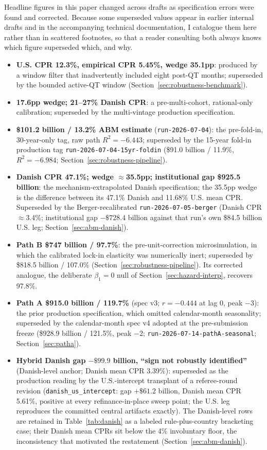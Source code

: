 \documentclass[12pt]{article}
\begin{document}
Headline figures in this paper changed across drafts as specification errors were found and corrected. Because some superseded values appear in earlier internal drafts and in the accompanying technical documentation, I catalogue them here rather than in scattered footnotes, so that a reader consulting both always knows which figure superseded which, and why.

\begingroup\sloppy
\begin{itemize}
\item \textbf{U.S. CPR 12.3\%, empirical CPR 5.45\%, wedge 35.1pp}: produced by a window filter that inadvertently included eight post-QT months; superseded by the bounded active-QT window (Section~\ref{sec:robustness-benchmark}).
\item \textbf{17.6pp wedge; 21--27\% Danish CPR}: a pre-multi-cohort, rational-only calibration; superseded by the multi-vintage production specification.
\item \textbf{\$101.2 billion / 13.2\% ABM estimate} (\texttt{run-2026-07-04}): the pre-fold-in, 30-year-only tag, raw path $R^2 = -6.443$; superseded by the 15-year fold-in production tag \texttt{run-2026-07-04-15yr-foldin} (\$91.0 billion / 11.9\%, $R^2 = -6.984$; Section~\ref{sec:robustness-pipeline}).
\item \textbf{Danish CPR 47.1\%; wedge $\approx$35.5pp; institutional gap \$925.5 billion}: the mechanism-extrapolated Danish specification; the 35.5pp wedge is the difference between its 47.1\% Danish and 11.68\% U.S. mean CPR. Superseded by the Berger-recalibrated \texttt{run-2026-07-05-berger} (Danish CPR $\approx$3.4\%; institutional gap $-\$728.4$ billion against that run's own \$84.5 billion U.S. leg; Section~\ref{sec:abm-danish}).
\item \textbf{Path B \$747 billion / 97.7\%}: the pre-unit-correction microsimulation, in which the calibrated lock-in elasticity was numerically inert; superseded by \$818.5 billion / 107.0\% (Section~\ref{sec:robustness-pipeline}). Its corrected analogue, the deliberate $\beta_1 = 0$ null of Section~\ref{sec:hazard-interp}, recovers 97.8\%.
\item \textbf{Path A \$915.0 billion / 119.7\%} (spec v3; $r = -0.444$ at lag 0, peak $-3$): the prior production specification, which omitted calendar-month seasonality; superseded by the calendar-month spec v4 adopted at the pre-submission freeze (\$928.9 billion / 121.5\%, peak $-2$; \texttt{run-2026-07-14-pathA-seasonal}; Section~\ref{sec:patha}).
\item \textbf{Hybrid Danish gap $-\$99.9$ billion, ``sign not robustly identified''} (Danish-level anchor; Danish mean CPR 3.39\%): superseded as the production reading by the U.S.-intercept transplant of a referee-round revision (\texttt{danish\_us\_intercept}: gap $+\$61.2$ billion, Danish mean CPR 5.61\%, positive at every refinance-in-place sweep point; the U.S. leg reproduces the committed central artifacts exactly). The Danish-level rows are retained in Table~\ref{tab:danish} as a labeled rule-plus-country bracketing case; their Danish mean CPRs sit below the 4\% involuntary floor, the inconsistency that motivated the restatement (Section~\ref{sec:abm-danish}).

\end{itemize}
\end{document}
